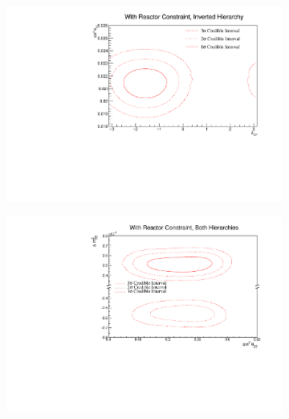 \begin{figure}[h]
  \begin{subfigure}[t]{1.0\textwidth}
    \includegraphics[width=\textwidth, trim={0mm 0mm 0mm 0mm}, clip,page=1]{Figures/OA/JointFit_wRC/Contours_2D_dcp_th13_IH_1_wRC_UnSmeared_CredibleInterval.pdf}
  \end{subfigure}
  \caption{}
  \label{fig:OscillationAnalysis_JointFit_wRC_TH13DCP}
\end{figure}

\begin{figure}[h]
  \begin{subfigure}[t]{1.0\textwidth}
    \includegraphics[width=\textwidth, trim={0mm 0mm 0mm 0mm}, clip,page=1]{Figures/OA/JointFit_wRC/Contours_2D_th23_dm32_BH_1_wRC_UnSmeared_CredibleInterval.pdf}
  \end{subfigure}
  \caption{}
  \label{fig:OscillationAnalysis_JointFit_wRC_TH23DM32}
\end{figure}

